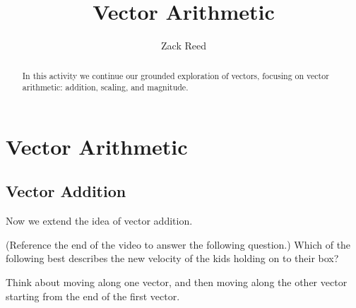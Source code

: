 \documentclass{ximera}
\title{Vector Arithmetic}
\author{Zack Reed}
\begin{document}
\begin{abstract}
In this activity we continue our grounded exploration of vectors, focusing on vector arithmetic: addition, scaling, and magnitude.
\end{abstract}
\maketitle

\section*{Vector Arithmetic}

\subsection*{Vector Addition}

Now we extend the idea of vector addition.

\begin{center}
\end{center}

\begin{problem}
(Reference the end of the video to answer the following question.)
Which of the following best describes the new velocity of the kids holding on to their box?
\begin{multipleChoice}
\end{multipleChoice}
\begin{feedback}
Think about moving along one vector, and then moving along the other vector starting from the end of the first vector.
\end{feedback}
\end{problem}
\end{document}
